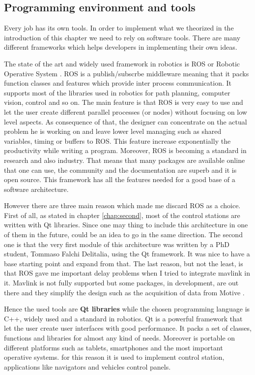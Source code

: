 \subsection{Programming environment and tools}

Every job has its own tools. In order to implement what we theorized in the introduction of this chapter we need to rely on software tools. There are many different frameworks which helps developers in implementing their own ideas.

 The state of the art and widely used framework in robotics is ROS or Robotic Operative System \cite{ROS}. ROS is a publish/subscrbe middleware meaning that it packs function classes and features which provide inter process communication. It supports most of the libraries used in robotics for path planning, computer vision, control and so on. The main feature is that ROS is very easy to use and let the user create different parallel processes (or nodes) without focusing on low level aspects. As consequence of that, the designer can concentrate on the actual problem he is working on and leave lower level managing such as shared variables, timing or buffers to ROS. This feature increase exponentially the productivity while writing a program. Moreover, ROS is becoming a standard in research and also industry. That means that many packages are available online that one can use, the community and the documentation are superb and it is open source. This framework has all the features needed for a good base of a software architecture.
 
 However there are three main reason which made me discard ROS as a choice. First of all, as stated in chapter \ref{chap:second}, most of the control stations are written with Qt libraries. Since one may thing to include this architecture in one of them in the future, could be an idea to go in the same direction. The second one is that the very first module of this architecture was written by a PhD student, Tommaso Falchi Delitalia, using the Qt framework. It was nice to have a base starting point and expand from that. The last reason, but not the least, is that ROS gave me important delay problems when I tried to integrate mavlink in it. Mavlink is not fully supported but some packages, in development, are out there and they simplify the design such as the acquisition of data from Motive \cite{optiros}.

Hence the used tools are \textbf{Qt libraries} while the chosen programming language is C++, widely used and a standard in robotics. Qt is a powerful framework that let the user create user interfaces with good performance. It packs a set of classes, functions and libraries for almost any kind of needs. Moreover is portable on different platforms such as tablets, smartphones and the most important operative systems. for this reason it is used to implement control station, applications like navigators and vehicles control panels.

